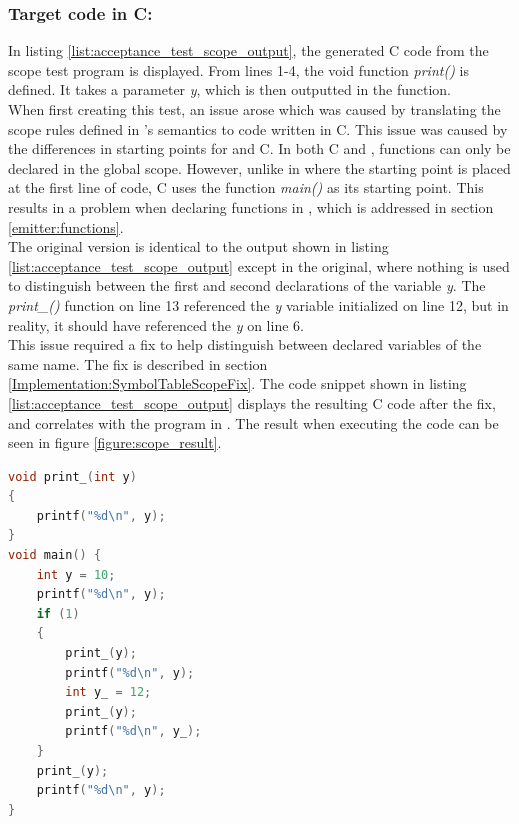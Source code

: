 \subsubsection{Target code in C:}
In listing \ref{list:acceptance_test_scope_output}, the generated C code from the scope test program is displayed. From lines 1-4, the void function \textit{print()} is defined. It takes a parameter \textit{y}, which is then outputted in the function. \\
When first creating this test, an issue arose which was caused by translating the scope rules defined in \lang's semantics to code written in C. This issue was caused by the differences in starting points for \lang and C. In both C and \lang, functions can only be declared in the global scope. However, unlike in \lang where the starting point is placed at the first line of code, C uses the function \textit{main()} as its starting point. This results in a problem when declaring functions in \lang, which is addressed in section \ref{emitter:functions}. \\
The original version is identical to the output shown in listing \ref{list:acceptance_test_scope_output} except in the original, where nothing is used to distinguish between the first and second declarations of the variable \textit{y}. The \textit{print\_()} function on line 13 referenced the \textit{y} variable initialized on line 12, but in reality, it should have referenced the \textit{y} on line 6.\\
This issue required a fix to help distinguish between declared variables of the same name. The fix is described in section \ref{Implementation:SymbolTableScopeFix}. The code snippet shown in listing \ref{list:acceptance_test_scope_output} displays the resulting C code after the fix, and correlates with the program in \lang. The result when executing the code can be seen in figure \ref{figure:scope_result}.

\newpage
\begin{lstlisting}[language = C, captionpos=b, firstnumber=1, label={list:acceptance_test_scope_output}, caption=Acceptance test scope code examples in C]
void print_(int y)
{
    printf("%d\n", y);
}
void main() {
    int y = 10;
    printf("%d\n", y);
    if (1)
    {
        print_(y);
        printf("%d\n", y);
        int y_ = 12;
        print_(y);
        printf("%d\n", y_);
    }
    print_(y);
    printf("%d\n", y);
}
\end{lstlisting}

